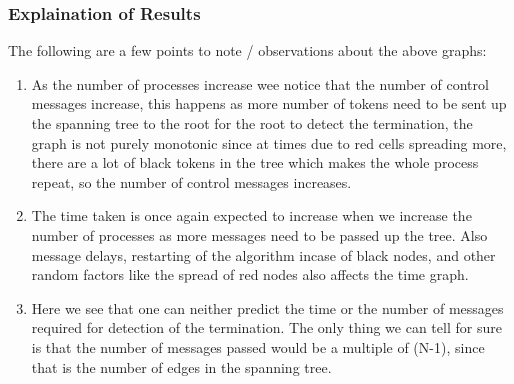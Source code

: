 \documentclass[a4paper,12pt]{report}
\begin{document}
\subsubsection{Explaination of Results}
The following are a few points to note / observations about the above graphs:
\begin{enumerate}
\item As the number of processes increase wee notice that the number of control messages increase, this happens as more number of tokens need to be sent up the spanning tree to the root for the root to detect the termination, the graph is not purely monotonic since at times due to red cells spreading more, there are a lot of black tokens in the tree which makes the whole process repeat, so the number of control messages increases.
\item The time taken is once again expected to increase when we increase the number of processes as more messages need to be passed up the tree. Also message delays, restarting of the algorithm incase of black nodes, and other random factors like the spread of red nodes also affects the time graph.
\item Here we see that one can neither predict the time or the number of messages required for detection of the termination. The only thing we can tell for sure is that the number of messages passed would be a multiple of (N-1), since that is the number of edges in the spanning tree.
\end{enumerate}
\newpage
\end{document}
